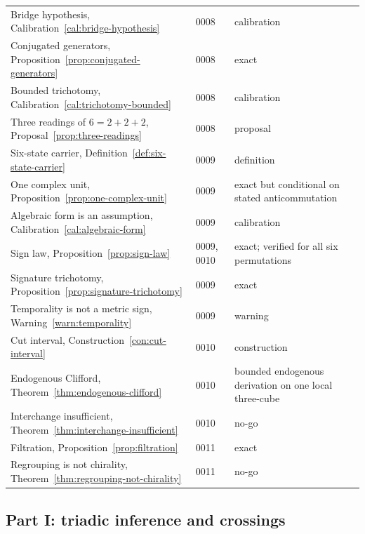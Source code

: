 \begin{longtable}{@{}p{}p{}p{}@{}}
Bridge hypothesis, Calibration~\ref{cal:bridge-hypothesis} & 0008 & calibration \\
Conjugated generators, Proposition~\ref{prop:conjugated-generators} & 0008 & exact \\
Bounded trichotomy, Calibration~\ref{cal:trichotomy-bounded} & 0008 & calibration \\
Three readings of $6=2+2+2$, Proposal~\ref{prop:three-readings} & 0008 & proposal \\
Six-state carrier, Definition~\ref{def:six-state-carrier} & 0009 & definition \\
One complex unit, Proposition~\ref{prop:one-complex-unit} & 0009 & exact but conditional on
  stated anticommutation \\
Algebraic form is an assumption, Calibration~\ref{cal:algebraic-form} & 0009 & calibration \\
Sign law, Proposition~\ref{prop:sign-law} & 0009, 0010 & exact; verified for all six
  permutations \\
Signature trichotomy, Proposition~\ref{prop:signature-trichotomy} & 0009 & exact \\
Temporality is not a metric sign, Warning~\ref{warn:temporality} & 0009 & warning \\
Cut interval, Construction~\ref{con:cut-interval} & 0010 & construction \\
Endogenous Clifford, Theorem~\ref{thm:endogenous-clifford} & 0010 & bounded endogenous
  derivation on one local three-cube \\
Interchange insufficient, Theorem~\ref{thm:interchange-insufficient} & 0010 & no-go \\
Filtration, Proposition~\ref{prop:filtration} & 0011 & exact \\
Regrouping is not chirality, Theorem~\ref{thm:regrouping-not-chirality} & 0011 & no-go \\
\bottomrule
\end{longtable}

\subsection{Part I: triadic inference and crossings}

